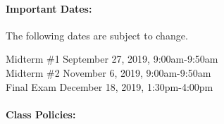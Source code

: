 \documentclass[11pt]{article}
\begin{document}
\paragraph{Important Dates:}

The following dates are subject to change.
\begin{center} \begin{minipage}{3.8in}
\begin{flushleft}
Midterm \#1      \dotfill September 27, 2019, 9:00am-9:50am\\
Midterm \#2      \dotfill November 6, 2019, 9:00am-9:50am  \\
Final Exam      \dotfill December 18, 2019, 1:30pm-4:00pm\\
\end{flushleft}
\end{minipage}
\end{center}

\paragraph{Class Policies:}  
\end{document}
